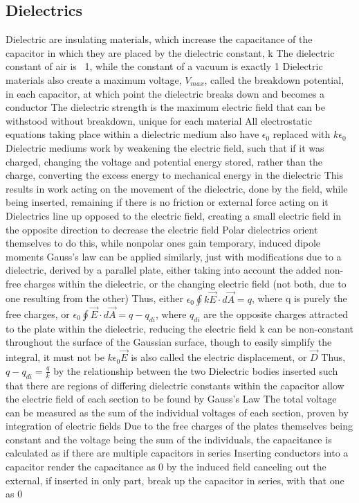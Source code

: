 \documentclass[11 pt, twoside]{article}
\newenvironment{outline*}
{
	\begin{outline}[enumerate]
	}
	{\end{outline}
}
\begin{document}
\subsection{Dielectrics}
\begin{outline*}
\1 Dielectric are insulating materials, which increase the capacitance of the capacitor in which they are placed by the dielectric constant, k
\1 The dielectric constant of air is ~1, while the constant of a vacuum is exactly 1
\1 Dielectric materials also create a maximum voltage, $V_{max}$, called the breakdown potential, in each capacitor, at which point the dielectric breaks down and becomes a conductor
\2 The dielectric strength is the maximum electric field that can be withstood without breakdown, unique for each material
\1 All electrostatic equations taking place within a dielectric medium also have $\epsilon_0$ replaced with $k\epsilon_0$
\1 Dielectric mediums work by weakening the electric field, such that if it was charged, changing the voltage and potential energy stored, rather than the charge, converting the excess energy to mechanical energy in the dielectric
\2 This results in work acting on the movement of the dielectric, done by the field, while being inserted, remaining if there is no friction or external force acting on it
\1 Dielectrics line up opposed to the electric field, creating a small electric field in the opposite direction to decrease the electric field
\2 Polar dielectrics orient themselves to do this, while nonpolar ones gain temporary, induced dipole moments
\1 Gauss's law can be applied similarly, just with modifications due to a dielectric, derived by a parallel plate, either taking into account the added non-free charges within the dielectric, or the changing electric field (not both, due to one resulting from the other)
\2 Thus, either $\epsilon_0 \oint k\vec{E} \cdot d\vec{A} = q$, where q is purely the free charges, or $\epsilon_0 \oint \vec{E} \cdot d\vec{A} = q - q_{di}$, where $q_{di}$ are the opposite charges attracted to the plate within the dielectric, reducing the electric field
\3 k can be non-constant throughout the surface of the Gaussian surface, though to easily simplify the integral, it must not be
\3 $k\epsilon_0\vec{E}$ is also called the electric displacement, or $\vec{D}$
\2 Thus, $q - q_{di} = \frac{q}{k}$ by the relationship between the two
\1 Dielectric bodies inserted such that there are regions of differing dielectric constants within the capacitor allow the electric field of each section to be found by Gauss's Law
\2 The total voltage can be measured as the sum of the individual voltages of each section, proven by integration of electric fields
\2 Due to the free charges of the plates themselves being constant and the voltage being the sum of the individuals, the capacitance is calculated as if there are multiple capacitors in series
\1 Inserting conductors into a capacitor render the capacitance as 0 by the induced field canceling out the external, if inserted in only part, break up the capacitor in series, with that one as 0
\end{outline*}
\end{document}
